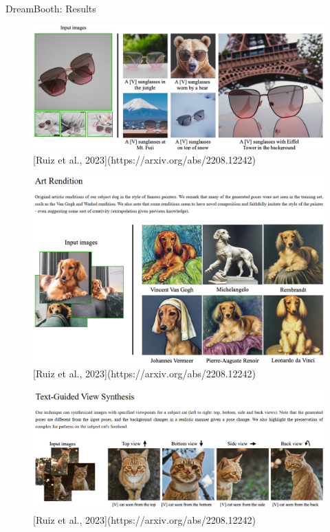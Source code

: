 \begin{frame}[allowframebreaks]{DreamBooth: Results}
\begin{figure}
    \centering
    \includegraphics[width=\linewidth,height=\textheight,keepaspectratio]{images/adv-img-gen/dreambooth-result-1.png}
    \small [Ruiz et al., 2023](https://arxiv.org/abs/2208.12242)
\end{figure}

\framebreak

\begin{figure}
    \centering
    \includegraphics[width=\linewidth,height=\textheight,keepaspectratio]{images/adv-img-gen/dreambooth-result-2.png}
    \small [Ruiz et al., 2023](https://arxiv.org/abs/2208.12242)
\end{figure}

\framebreak
\begin{figure}
    \centering
    \includegraphics[width=\linewidth,height=\textheight,keepaspectratio]{images/adv-img-gen/dreambooth-result-3.png}
    \small [Ruiz et al., 2023](https://arxiv.org/abs/2208.12242)
\end{figure}


\end{frame}
